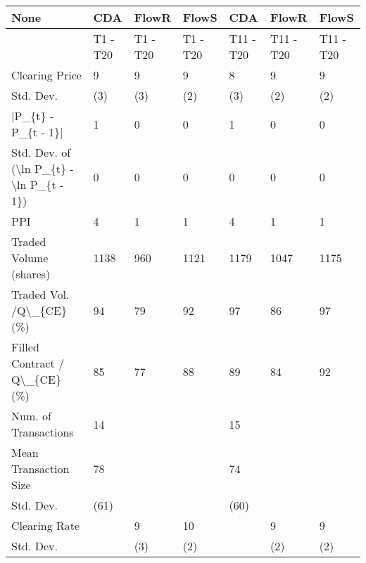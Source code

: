 \begin{tabular}{lllllll}
\hline
 None                                                      & CDA      & FlowR    & FlowS    & CDA       & FlowR     & FlowS     \\
\hline
                                                           & T1 - T20 & T1 - T20 & T1 - T20 & T11 - T20 & T11 - T20 & T11 - T20 \\
 Clearing Price                                            & 9        & 9        & 9        & 8         & 9         & 9         \\
 Std. Dev.                                                 & (3)      & (3)      & (2)      & (3)       & (2)       & (2)       \\
 |P\_\{t\} - P\_\{t - 1\}|                                       & 1        & 0        & 0        & 1         & 0         & 0         \\
 Std. Dev. of (\textbackslash{}ln P\_\{t\} - \textbackslash{}ln P\_\{t - 1\})                  & 0        & 0        & 0        & 0         & 0         & 0         \\
 PPI                                                       & 4        & 1        & 1        & 4         & 1         & 1         \\
 Traded Volume (shares)                                    & 1138     & 960      & 1121     & 1179      & 1047      & 1175      \\
 Traded Vol. /Q\textbackslash{}\_\{CE\} (\%)                                  & 94       & 79       & 92       & 97        & 86        & 97        \\
 Filled Contract / Q\textbackslash{}\_\{CE\} (\%)                             & 85       & 77       & 88       & 89        & 84        & 92        \\
 Num. of Transactions                                      & 14       &          &          & 15        &           &           \\
 Mean Transaction Size                                     & 78       &          &          & 74        &           &           \\
 Std. Dev.                                                 & (61)     &          &          & (60)      &           &           \\
 Clearing Rate                                             &          & 9        & 10       &           & 9         & 9         \\
 Std. Dev.                                                 &          & (3)      & (2)      &           & (2)       & (2)       \\

\end{tabular}

